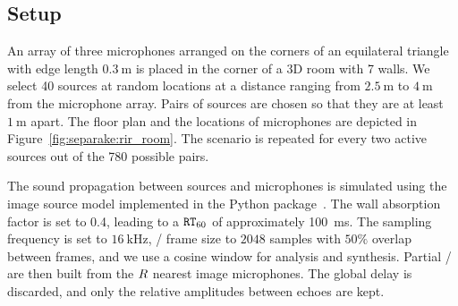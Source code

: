 \subsection{Setup}
An array of three microphones arranged on the corners of an equilateral triangle with edge length $\SI{0.3}{\m}$ is placed in the corner of a 3D room with 7 walls.
We select 40 sources at random locations at a distance ranging from $\SI{2.5}{\m}$ to $\SI{4}{\m}$ from the microphone array.
Pairs of sources are chosen so that they are at least $\SI{1}{\m}$ apart.
The floor plan and the locations of microphones are depicted in Figure~\ref{fig:separake:rir_room}.
The scenario is repeated for every two active sources out of the 780 possible pairs.

\mynewline
The sound propagation between sources and microphones is simulated using the
image source model implemented in the  Python package~.
The wall absorption factor is set to 0.4, leading to a $\mathtt{RT}_{60}$ of approximately 100~ms.
The sampling frequency is set to $\SI{16}{\kHz}$, \STFT/ frame size to $2048$ samples with $50\%$ overlap between frames, and we use a cosine window for analysis and synthesis.
Partial \RTFs/ are then built from the $R$ nearest image microphones.
The global delay is discarded, and only the relative amplitudes between echoes are kept.

